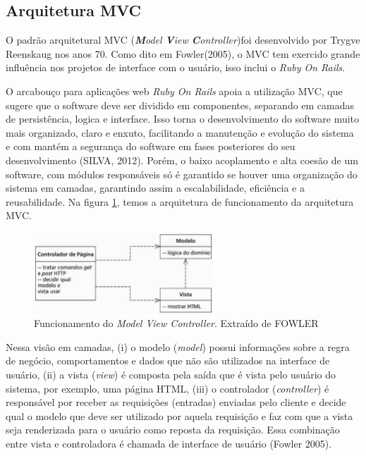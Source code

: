 \subsection{Arquitetura MVC}
\label{sub:arquiteturamvc}

O padrão arquitetural MVC (\textit{\textbf{M}odel \textbf{V}iew \textbf{C}ontroller})foi desenvolvido por Trygve Reenskaug nos anos 70. Como dito em Fowler(2005), o MVC tem exercido grande influência nos projetos de interface com o usuário, isso inclui o \textit{Ruby On Rails}.

O arcabouço para aplicações web \textit{Ruby On Rails} apoia a utilização  MVC, que sugere que o software deve ser dividido em componentes, separando em camadas de persistência, logica e interface. Isso torna o desenvolvimento do software muito mais organizado, claro e enxuto, facilitando a manutenção e evolução do sistema e com mantém a segurança do software em fases posteriores do seu desenvolvimento\cite{} (SILVA, 2012). Porém, o baixo acoplamento e alta coesão de um software, com módulos responsáveis só é garantido se houver uma organização do sistema em camadas, garantindo assim a escalabilidade, eficiência e a reusabilidade. Na figura \ref{fig:arquiteturamvc}, temos a arquitetura de funcionamento da arquitetura MVC.

\graphicspath{{figuras/}}
\begin{figure}[H]
\centering
\includegraphics[width=0.6\textwidth]{funcionamentomvc}
\caption[Funcionamento do \textit{Model View Controller}]{Funcionamento do \textit{Model View Controller}. Extraído de FOWLER}
\label{fig:arquiteturamvc}
\end{figure}

Nessa visão em camadas, (i) o modelo (\textit{model}) possui informações sobre a regra de negócio, comportamentos e dados que não são utilizados na interface de usuário, (ii) a vista (\textit{view}) é composta pela saída que é vista pelo usuário do sistema, por exemplo, uma página HTML, (iii) o controlador (\textit{controller}) é responsável por receber as requisições (entradas) enviadas pelo cliente e decide qual o modelo que deve ser utilizado por aquela requisição e faz com que a vista seja renderizada para o usuário como reposta da requisição. Essa combinação entre vista e controladora é chamada de interface de usuário (Fowler 2005).

